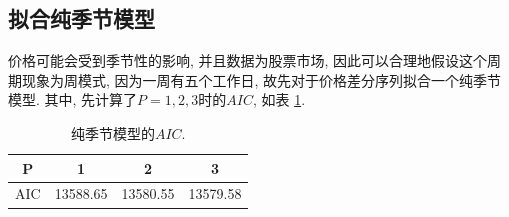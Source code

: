 \documentclass[11pt]{article}
\begin{document}
\subsection{拟合纯季节模型}
\qquad 价格可能会受到季节性的影响, 并且数据为股票市场, 因此可以合理地假设这个周期现象为周模式, 因为一周有五个工作日, 故先对于价格差分序列拟合一个纯季节模型. 其中, 先计算了$P=1,2,3$时的$AIC$, 如表 \ref{tab:my-table3}. 
\begin{table}[htbp]
    \centering
    \caption{纯季节模型的$AIC$.}
    \label{tab:my-table3}
    \begin{tabular}{c|ccc}
    \hline
    P   & 1        & 2        & 3        \\ \hline
    AIC & 13588.65 & 13580.55 & 13579.58 \\ \hline
    \end{tabular}
\end{table}
\end{document}

